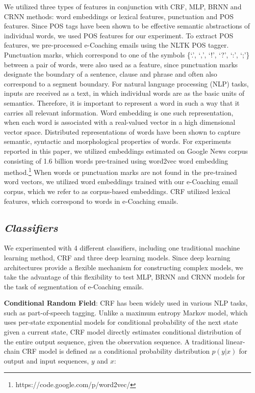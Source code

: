 \documentclass{amia}
\begin{document}
We utilized three types of features in conjunction with CRF, MLP, BRNN and CRNN methods: word embeddings or lexical features, punctuation and POS features. Since POS tags have been shown to be effective semantic abstractions of individual words, we used POS features for our experiment.\cite{liu2005using,treviso2017sentence} To extract POS features, we pre-processed e-Coaching emails using the NLTK POS tagger. Punctuation marks, which correspond to one of the symbols \{`.', `,', `!', `?', `:', `;'\} between a pair of words, were also used as a feature, since punctuation marks designate the boundary of a sentence, clause and phrase and often also correspond to a segment boundary.\cite{cho2002text} For natural language processing (NLP) tasks, inputs are received as a text, in which individual words are as the basic units of semantics. Therefore, it is important to represent a word in such a way that it carries all relevant information. Word embedding is one such representation, when each word is associated with a real-valued vector in a high dimensional vector space. Distributed representations of words have been shown to capture semantic, syntactic and morphological properties of words.\cite{pennington2014glove, mikolov2013distributed} For experiments reported in this paper, we utilized embeddings estimated on Google News corpus consisting of 1.6 billion words pre-trained using word2vec word embedding method.\footnote{\label{fn:word2vec}https://code.google.com/p/word2vec/} When words or punctuation marks are not found in the pre-trained word vectors, we utilized word embeddings trained with our e-Coaching email corpus, which we refer to as corpus-based embeddings. CRF utilized lexical features, which correspond to words in e-Coaching emails. 

\subsection*{\textit{Classifiers}}

We experimented with 4 different classifiers, including one traditional machine learning method, CRF and three deep learning models. Since deep learning architectures provide a flexible mechanism for constructing complex models, we take the advantage of this flexibility to test MLP, BRNN and CRNN models for the task of segmentation of e-Coaching emails.

\textbf{Conditional Random Field}: CRF has been widely used in various NLP tasks, such as part-of-speech tagging.\cite{lafferty2001conditional, hirohata2008identifying} Unlike a maximum entropy Markov model, which uses per-state exponential models for conditional probability of the next state given a current state, CRF model directly estimates conditional distribution of the entire output sequence, given the observation sequence. A traditional linear-chain CRF model is defined as a conditional probability distribution $p(y|x)$ for output and input sequences, $y$ and $x$:
\end{document}
